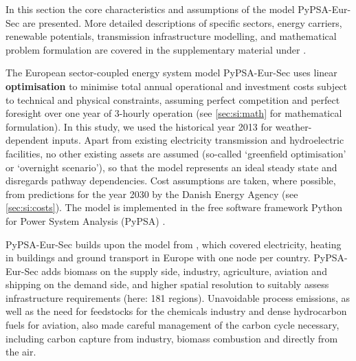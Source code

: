 In this section the core characteristics and assumptions of the model
PyPSA-Eur-Sec are presented. More detailed descriptions of specific sectors,
energy carriers, renewable potentials, transmission infrastructure modelling,
and mathematical problem formulation are covered in the supplementary material
under .

The European sector-coupled energy system model PyPSA-Eur-Sec uses linear
\textbf{optimisation} to minimise total annual operational and investment costs subject
to technical and physical constraints, assuming perfect competition and perfect
foresight over one year of 3-hourly operation (see \cref{sec:si:math} for
mathematical formulation). In this study, we used the historical year 2013 for
weather-dependent inputs. Apart from existing electricity transmission and
hydroelectric facilities, no other existing assets are assumed (so-called
`greenfield optimisation' or `overnight scenario'), so that the model represents
an ideal steady state and disregards pathway dependencies. Cost assumptions are
taken, where possible, from predictions for the year 2030 by the Danish Energy
Agency \cite{dea2019} (see \cref{sec:si:costs}). The model is implemented in the
free software framework Python for Power System Analysis (PyPSA)
\cite{brownPyPSAPython2018}.

PyPSA-Eur-Sec builds upon the model from \cite{brownSynergiesSector2018}, which
covered electricity, heating in buildings and ground transport in Europe with
one node per country. PyPSA-Eur-Sec adds biomass on the supply side, industry,
agriculture, aviation and shipping on the demand side, and higher spatial
resolution to suitably assess infrastructure requirements (here: 181 regions).
Unavoidable process emissions, as well as the need for feedstocks for the
chemicals industry and dense hydrocarbon fuels for aviation, also made careful
management of the carbon cycle necessary, including carbon capture from
industry, biomass combustion and directly from the air.

